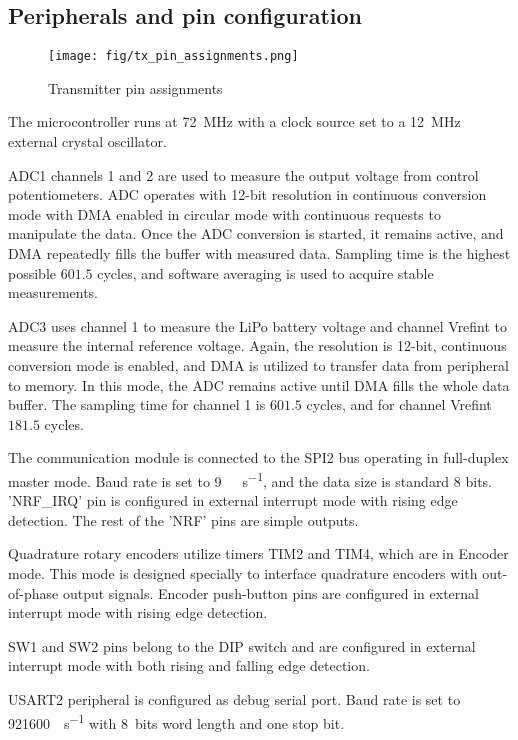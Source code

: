 \subsection{Peripherals and pin configuration}
\label{sub:tx_conf}
\begin{figure}[h]
\centering
\texttt{[image: fig/tx\_pin\_assignments.png]}
\caption{Transmitter pin assignments}
\label{fig:tx_conf}
\end{figure}
\noindent
The microcontroller runs at \SI{72}{\MHz} with a clock source set to a \SI{12}{\MHz} external crystal oscillator.

ADC1 channels 1 and 2 are used to measure the output voltage from control potentiometers. ADC operates with 12-bit resolution in continuous conversion mode with DMA enabled in circular mode with continuous requests to manipulate the data. Once the ADC conversion is started, it remains active, and DMA repeatedly fills the buffer with measured data. Sampling time is the highest possible $601.5$ cycles, and software averaging is used to acquire stable measurements.

ADC3 uses channel 1 to measure the LiPo battery voltage and channel Vrefint to measure the internal reference voltage. Again, the resolution is 12-bit, continuous conversion mode is enabled, and DMA is utilized to transfer data from peripheral to memory. In this mode, the ADC remains active until DMA fills the whole data buffer. The sampling time for channel 1 is $601.5$ cycles, and for channel Vrefint $181.5$ cycles.

The communication module is connected to the SPI2 bus operating in full-duplex master mode. Baud rate is set to \SI{9}{\mega\bit\per\second}, and the data size is standard 8 bits. 'NRF\_IRQ' pin is configured in external interrupt mode with rising edge detection. The rest of the 'NRF' pins are simple outputs.

Quadrature rotary encoders utilize timers TIM2 and TIM4, which are in Encoder mode. This mode is designed specially to interface quadrature encoders with out-of-phase output signals. Encoder push-button pins are configured in external interrupt mode with rising edge detection.

SW1 and SW2 pins belong to the DIP switch and are configured in external interrupt mode with both rising and falling edge detection.

USART2 peripheral is configured as debug serial port. Baud rate is set to \SI{921600}{\bit\per\second} with 8~bits word length and one stop bit.


